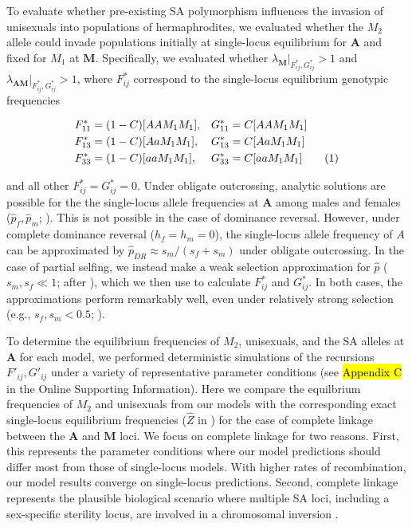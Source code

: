 \documentclass[9pt,twocolumn,twoside,lineno]{gsajnl}
\newcommand\numberthis{\addtocounter{equation}{1}\tag{\theequation}}
\begin{document}
To evaluate whether pre-existing SA polymorphism influences the invasion of unisexuals into populations of hermaphrodites, we evaluated whether the $M_2$ allele could invade populations initially at single-locus equilibrium for $\mathbf{A}$ and fixed for $M_1$ at $\mathbf{M}$. Specifically, we evaluated whether $\lambda_\mathbf{M} \rvert_{F^{\ast}_{ij},G^{\ast}_{ij}} > 1$ and $\lambda_\mathbf{AM} \rvert_{F^{\ast}_{ij},G^{\ast}_{ij}} > 1$, where $F^{\ast}_{ij}$ correspond to the single-locus equilibrium genotypic frequencies
\begin{linenomath}\begin{align*} \label{eq:SA1locEQ}
	F^{\ast}_{11} &= (1 - C)[AAM_1M_1],& G^{\ast}_{11} &= C[AAM_1M_1]  \\
	F^{\ast}_{13} &= (1 - C)[AaM_1M_1],& G^{\ast}_{13} &= C[AaM_1M_1] \\
	F^{\ast}_{33} &= (1 - C)[aaM_1M_1],& G^{\ast}_{33} &= C[aaM_1M_1] \numberthis \\
\end{align*}\end{linenomath}

\noindent and all other $F^{\ast}_{ij} = G^{\ast}_{ij} =0$. Under obligate outcrossing, analytic solutions are possible for the the single-locus allele frequencies at $\mathbf{A}$ among males and females ($\hat{p}_f,\hat{p}_m$; \citealt{Kidwell1977}). This is not possible in the case of dominance reversal. However, under complete dominance reversal ($h_f = h_m = 0$), the single-locus allele frequency of $A$ can be approximated by $\hat{p}_{DR} \approx s_m / (s_f + s_m)$ under obligate outcrossing. In the case of partial selfing, we instead make a weak selection approximation for $\hat{p}$ ($s_m,s_f \ll 1$; after \citealt{JordanConnallon2014}), which we then use to calculate $F^{\ast}_{ij}$ and $G^{\ast}_{ij}$. In both cases, the approximations perform remarkably well, even under relatively strong selection (e.g., $s_f,s_m < 0.5$; \citealt{ConnallonJordan2016,Olito2017}). 

To determine the equilibrium frequencies of $M_2$, unisexuals, and the SA alleles at $\mathbf{A}$ for each model, we performed deterministic simulations of the recursions $F'_{ij},G'_{ij}$ under a variety of representative parameter conditions (see \hl{Appendix C} in the Online Supporting Information). Here we compare the equilbrium frequencies of $M_2$ and unisexuals from our models with the corresponding exact single-locus equilibrium frequencies ($\hat{Z}$ in \citealt{Charlesworth1978a}) for the case of complete linkage between the $\mathbf{A}$ and $\mathbf{M}$ loci. We focus on complete linkage for two reasons. First, this represents the parameter conditions where our model predictions should differ most from those of single-locus models. With higher rates of recombination, our model results converge on single-locus predictions. Second, complete linkage represents the plausible biological scenario where multiple SA loci, including a sex-specific sterility locus, are involved in a chromosomal inversion \citep{LeeKelly2015}.
\end{document}
